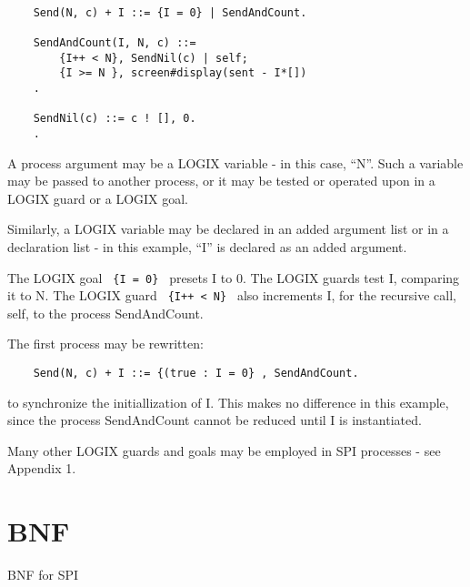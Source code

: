 \begin{verbatim}

    Send(N, c) + I ::= {I = 0} | SendAndCount.

    SendAndCount(I, N, c) ::=
        {I++ < N}, SendNil(c) | self;
        {I >= N }, screen#display(sent - I*[])
    .

    SendNil(c) ::= c ! [], 0.
    .
\end{verbatim}

\noindent
A process argument may be a LOGIX variable - in this case, ``N''.
Such a variable may be passed to another process, or it may be
tested or operated upon in a LOGIX guard or a LOGIX goal.

\noindent
Similarly, a LOGIX variable may be declared in an added argument
list or in a declaration list - in this example, ``I'' is declared
as an added argument.

\noindent
The LOGIX goal \verb+ {I = 0} + presets I to 0.
\noindent
The LOGIX guards test I, comparing it to N.
The LOGIX guard \verb# {I++ < N} # also increments I, for the
recursive call, self, to the process SendAndCount.

\noindent
The first process may be rewritten:

\begin{verbatim}
    Send(N, c) + I ::= {(true : I = 0} , SendAndCount.
\end{verbatim}

\noindent
to synchronize the initiallization of I.  This makes no difference
in this example, since the process SendAndCount cannot be reduced
until I is instantiated.

\noindent
Many other LOGIX guards and goals may be employed in SPI processes -
see \cite{logix:user-man} Appendix 1.

\appendix
\chapter{BNF}
\label{BNF}
BNF for SPI

